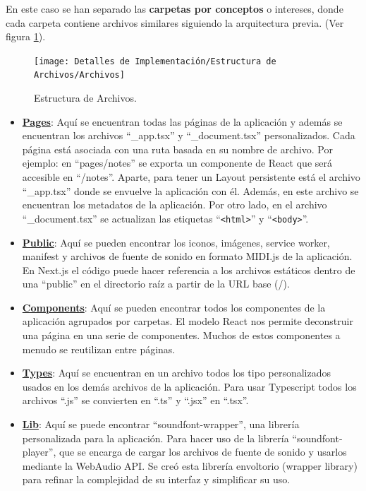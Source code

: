 \documentclass[12pt,twoside,titlepage]{report}
\begin{document}
En este caso se han separado las \textbf{carpetas por conceptos} o intereses, donde cada carpeta contiene archivos similares siguiendo la arquitectura previa.
(Ver figura \ref{fig:Archivos}).

\begin{figure}[H]
    \centering
    \texttt{[image: Detalles de Implementación/Estructura de Archivos/Archivos]}
    \caption{Estructura de Archivos.}
    \label{fig:Archivos}
\end{figure}

\begin{itemize}
    \item \href{https://github.com/alberttogoca/EarFit/tree/main/src/pages}{\textbf{Pages}}: Aquí se encuentran todas las páginas de la aplicación y además se encuentran los archivos ``\_app.tsx'' y ``\_document.tsx'' personalizados. Cada página está asociada con una ruta basada en su nombre de archivo. Por ejemplo: en ``pages/notes'' se exporta un componente de React que será accesible en ``/notes''.
    Aparte, para tener un Layout persistente está el archivo ``\_app.tsx'' donde se envuelve la aplicación con él. Además, en este archivo se encuentran los metadatos de la aplicación. Por otro lado, en el archivo ``\_document.tsx'' se actualizan las etiquetas ``\texttt{<html>}'' y ``\texttt{<body>}''.
    \item \href{https://github.com/alberttogoca/EarFit/tree/main/public}{\textbf{Public}}: Aquí se pueden encontrar los iconos, imágenes, service worker, manifest y archivos de fuente de sonido en formato MIDI.js de la aplicación. En Next.js el código puede hacer referencia a los archivos estáticos dentro de una ``public'' en el directorio raíz a partir de la URL base (/).
    \item \href{https://github.com/alberttogoca/EarFit/tree/main/src/components}{\textbf{Components}}: Aquí se pueden encontrar todos los componentes de la aplicación agrupados por carpetas. El modelo React nos permite deconstruir una página en una serie de componentes. Muchos de estos componentes a menudo se reutilizan entre páginas.
    \item \href{https://github.com/alberttogoca/EarFit/tree/main/src/types}{\textbf{Types}}: Aquí se encuentran en un archivo todos los tipo personalizados usados en los demás archivos de la aplicación. Para usar Typescript todos los archivos ``.js'' se convierten en ``.ts'' y ``.jsx'' en ``.tsx''.
    \item \href{https://github.com/alberttogoca/EarFit/tree/main/src/lib}{\textbf{Lib}}: Aquí se puede encontrar ``soundfont-wrapper'', una librería personalizada para la aplicación. Para hacer uso de la librería ``soundfont-player'', que se encarga de cargar los archivos de fuente de sonido y usarlos mediante la WebAudio API. Se creó esta librería envoltorio (wrapper library) para refinar la complejidad de su interfaz y simplificar su uso.

\end{itemize}
\end{document}
